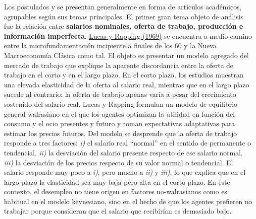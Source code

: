 \documentclass{nuevotema}
\begin{document}
Los postulados y  se presentan generalmente en forma de artículos académicos, agrupables según sus temas principales. El primer gran tema objeto de análisis fue la relación entre \textbf{salarios nominales, oferta de trabajo, producción e información imperfecta}. \underline{Lucas y Rapping (1969)} se encuentra a medio camino entre la microfundamentación incipiente a finales de los 60 y la Nueva Macroeconomía Clásica como tal. El objeto es presentar un modelo agregado del mercado de trabajo que explique la aparente discordancia entre la oferta de trabajo en el corto y en el largo plazo. En el corto plazo, los estudios muestran una elevada elasticidad de la oferta al salario real, mientras que en el largo plazo sucede al contrario: la oferta de trabajo apenas varía a pesar del crecimiento sostenido del salario real. Lucas y Rapping formulan un modelo de equilibrio general walrasiano en el que los agentes optimizan la utilidad en función del consumo y el ocio presentes y futuro y toman expectativas adaptativas para estimar los precios futuros. Del modelo se desprende que la oferta de trabajo responde a tres factores: \textit{i)} el salario real ``normal'' en el sentido de permanente o tendencial, \textit{ii)} la desviación del salario presente respecto de ese salario normal, \textit{iii)} la desviación de los precios respecto de su valor normal o tendencial. El salario responde muy poco a \textit{i)}, pero mucho a \textit{ii)} y \textit{iii)}, lo que explica que en el largo plazo la elasticidad sea muy baja pero alta en el corto plazo. En este contexto, el desempleo no tiene origen en factores no-walrasianos como es habitual en el modelo keynesiano, sino en el hecho de que los agentes prefieren no trabajar porque consideran que el salario que recibirían es demasiado bajo. 
\end{document}
